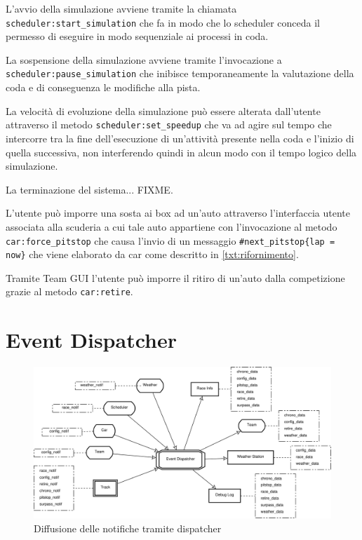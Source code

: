 \documentclass[11pt,a4paper]{report}
\newcommand{\fun}[1]{\texttt{#1}}
\begin{document}
L'avvio della simulazione avviene tramite la chiamata \fun{scheduler:start\_simulation} che fa in modo che lo scheduler conceda il permesso di eseguire in modo sequenziale ai processi in coda.

La sospensione della simulazione avviene tramite l'invocazione a \fun{scheduler:pause\_simulation} che inibisce temporaneamente la valutazione della coda e di conseguenza le modifiche alla pista.

La velocità di evoluzione della simulazione può essere alterata dall'utente attraverso il metodo \fun{scheduler:set\_speedup} che va ad agire sul tempo che intercorre tra la fine dell'esecuzione di un'attività presente nella coda e l'inizio di quella successiva, non interferendo quindi in alcun modo con il tempo logico della simulazione.

La terminazione del sistema... FIXME.

L'utente può imporre una sosta ai box ad un'auto attraverso l'interfaccia utente associata alla scuderia a cui tale auto appartiene con l'invocazione al metodo \fun{car:force\_pitstop} che causa l'invio di un messaggio \fun{\#next\_pitstop\{lap = now\}} che viene elaborato da car come descritto in \ref{txt:rifornimento}.

Tramite Team GUI l'utente può imporre il ritiro di un'auto dalla competizione grazie al metodo \fun{car:retire}.
\section{Event Dispatcher}
\begin{landscape}
\begin{figure}
\includegraphics[width=0.75\paperheight]{diagrammi/NotifFlow}
\caption{Diffusione delle notifiche tramite dispatcher}
\label{fig:notifFlow}
\end{figure}
\end{landscape}
\end{document}
